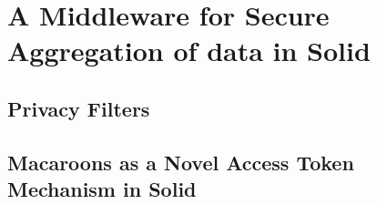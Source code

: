 \chapter{A Middleware for Secure Aggregation of data in Solid}
\label{cha:solution-overview}

\section{Privacy Filters}

\section{Macaroons as a Novel Access Token Mechanism in Solid}

